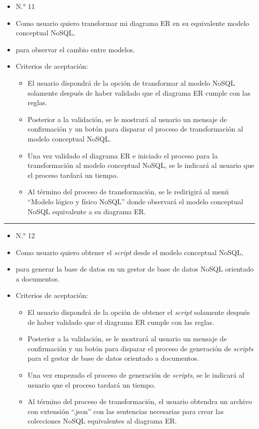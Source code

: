 \begin{itemize}
	\item N.° 11
	\item Como usuario quiero transformar mi diagrama ER en su equivalente modelo conceptual NoSQL,
	\item para observar el cambio entre modelos.
	\item Criterios de aceptación:
	\begin{itemize}
		\item El usuario dispondrá de la opción de transformar al modelo NoSQL solamente después de haber validado que el diagrama ER cumple con las reglas.
		\item Posterior a la validación, se le mostrará al usuario un mensaje de confirmación y un botón para disparar el proceso de transformación al modelo conceptual NoSQL.
		\item Una vez validado el diagrama ER e iniciado el proceso para la transformación al modelo conceptual NoSQL, se le indicará al usuario que el proceso tardará un tiempo.
		\item Al término del proceso de transformación, se le redirigirá al menú ``Modelo lógico y físico NoSQL'' donde observará el modelo conceptual NoSQL equivalente a su diagrama ER.
	\end{itemize}
\end{itemize}
\noindent\rule{\textwidth}{1pt}
\begin{itemize}
	\item N.° 12
	\item Como usuario quiero obtener el \textit{script} desde el modelo conceptual NoSQL,
	\item para generar la base de datos en un gestor de base de datos NoSQL orientado a documentos.
	\item Criterios de aceptación:
	\begin{itemize}
		\item El usuario dispondrá de la opción de obtener el \textit{script} solamente después de haber validado que el diagrama ER cumple con las reglas.
		\item Posterior a la validación, se le mostrará al usuario un mensaje de confirmación y un botón para disparar el proceso de generación de \textit{scripts} para el gestor de base de datos orientado a documentos.
		\item Una vez empezado el proceso de generación de \textit{scripts}, se le indicará al usuario que el proceso tardará un tiempo.
		\item Al término del proceso de transformación, el usuario obtendra un archivo con extensión ``.json'' con las sentencias necesarias para crear las colecciones NoSQL equivalentes al diagrama ER.
	\end{itemize}
\end{itemize}

